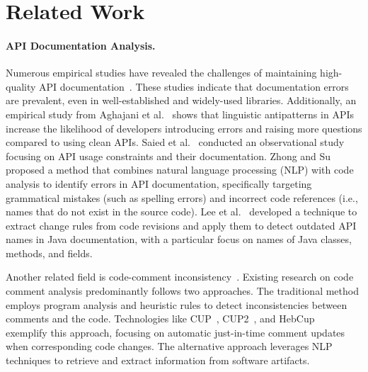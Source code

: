 \section{Related Work}\label{sec:related-mpchecker}

\paragraph{API Documentation Analysis.}
Numerous empirical studies have revealed the challenges of maintaining high-quality API
documentation~\cite{aghajani2018large,arnaoudova2016linguistic, dagenais2010creating,
aghajani2020software, head2018not, liu2020generating, monperrus2012should, saied2015observational,
shi2011empirical, uddin2015api, zhong2020empirical, kang2021active}. These studies indicate that
documentation errors are prevalent, even in well-established and widely-used libraries.
Additionally, an empirical study from Aghajani et al.~\cite{aghajani2018large} shows that linguistic antipatterns in APIs
increase the likelihood of developers introducing errors and raising more questions compared to
using clean APIs. Saied et al.~\cite{saied2015observational} conducted an observational study focusing on API usage constraints
and their documentation. Zhong and Su~\cite{zhong2013detecting} proposed a method that combines natural language processing
(NLP) with code analysis to identify errors in API documentation, specifically targeting
grammatical mistakes (such as spelling errors) and incorrect code references (i.e., names that do
not exist in the source code). Lee et al.~\cite{lee2019automatic} developed a technique to extract change rules from code
revisions and apply them to detect outdated API names in Java documentation, with a particular
focus on names of Java classes, methods, and fields.

Another related field is code-comment inconsistency~\cite{blasi2018replicomment, habib2018class, liu2014automatic, nie2019framework, panthaplackel2021deep, steidl2013quality, zhai2020cpc, wen2019large}. Existing research on code comment analysis predominantly follows two approaches. The traditional method employs program analysis and heuristic rules to detect inconsistencies between comments and the code. Technologies like CUP~\cite{liu2020automating}, CUP2~\cite{liu2021just}, and HebCup~\cite{lin2021automated} exemplify this approach, focusing on automatic just-in-time comment updates when corresponding code changes. The alternative approach leverages NLP techniques to retrieve and extract information from software artifacts.

